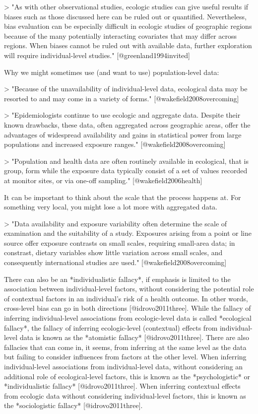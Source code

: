 > "As with other observational studies, ecologic studies can give useful results
if biases such as those discussed here can be ruled out or quantified.
Nevertheless, bias evaluation can be especially difficult in ecologic studies of
geographic regions because of the many potentially interacting covariates that
may differ across regions. When biases cannot be ruled out with available data,
further exploration will require individual-level studies."
[@greenland1994invited]

Why we might sometimes use (and want to use) population-level data: 

> "Because of the unavailability of individual-level data, ecological data may
be resorted to and may come in a variety of forms." [@wakefield2008overcoming]

> "Epidemiologists continue to use ecologic and aggregate data. Despite their 
known drawbacks, these data, often aggregated across geographic areas, offer the
advantages of widespread availability and gains in statistical power from large
populations and increased exposure ranges." [@wakefield2008overcoming] 

> "Population and health data are often routinely available in ecological, that
is group, form while the exposure data typically consist of a set of values
recorded at monitor sites, or via one-off sampling." [@wakefield2006health]

It can be important to think about the scale that the process happens at. For
something very local, you might lose a lot more with aggregated data. 

> "Data availability and exposure variability often determine the scale of
examination and the suitability of a study. Exposures arising from a point or
line source offer exposure contrasts on small scales, requiring small-area data;
in constrast, dietary variables show little variation across small scales, and
consequently international studies are used." [@wakefield2008overcoming]

There can also be an *individualistic fallacy*, if emphasis is limited to the
association between individual-level factors, without considering the potential
role of contextual factors in an individual's risk of a health outcome. In other
words, cross-level bias can go in both directions [@idrovo2011three]. While the
fallacy of inferring individual-level associations from ecologic-level data is
called *ecological fallacy*, the fallacy of inferring ecologic-level
(contextual) effects from individual-level data is known as the *atomistic
fallacy* [@idrovo2011three]. There are also fallacies that can come in, it
seems, from inferring at the same level as the data but failing to consider
influences from factors at the other level. When inferring individual-level
associations from individual-level data, without considering an additional role
of ecological-level factors, this is known as the *psychologistic* or
*individualistic fallacy* [@idrovo2011three]. When inferring contextual effects
from ecologic data without considering individual-level factors, this is known
as the *sociologistic fallacy* [@idrovo2011three].

